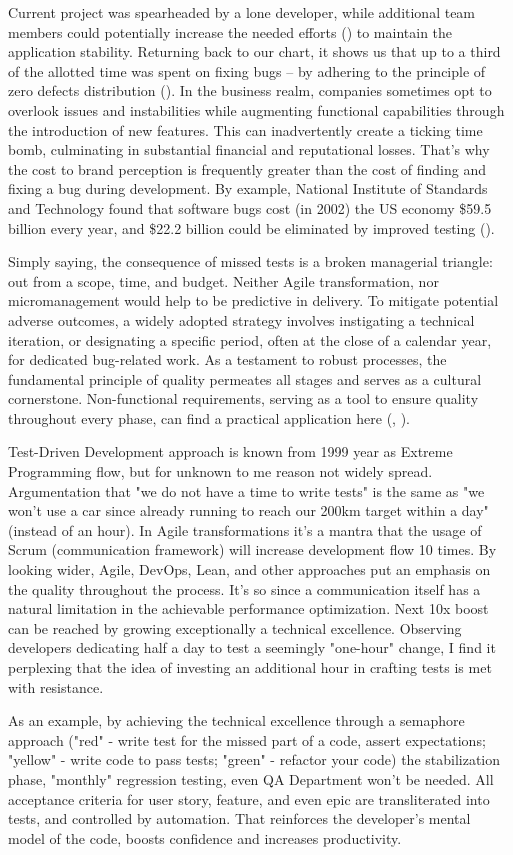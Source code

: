 Current project was spearheaded by a lone developer, while additional team members could potentially increase 
the needed efforts (\cite{Alm21}) to maintain the application stability. Returning back to our chart, it shows us 
that up to a third of the allotted time was spent on fixing bugs -- by adhering to the principle of zero 
defects distribution (\cite{Allan98}). In the business realm, companies sometimes opt to overlook issues and instabilities 
while augmenting functional capabilities through the introduction of new features. This can inadvertently create a ticking 
time bomb, culminating in substantial financial and reputational losses. That's why the cost to brand perception is 
frequently greater than the cost of finding and fixing a bug during development. By example, National Institute of 
Standards and Technology found that software bugs cost (in 2002) the US economy \$59.5 billion every year, and 
\$22.2 billion could be eliminated by improved testing (\cite{RTI02}).

Simply saying, the consequence of missed tests is a broken managerial triangle: out from a scope, time, and budget.
Neither Agile transformation, nor micromanagement would help to be predictive in delivery. To mitigate potential adverse 
outcomes, a widely adopted strategy involves instigating a technical iteration, or designating a specific period, often 
at the close of a calendar year, for dedicated bug-related work. As a testament to robust processes, the fundamental 
principle of quality permeates all stages and serves as a cultural cornerstone. Non-functional requirements, serving 
as a tool to ensure quality throughout every phase, can find a practical application here (\cite{Sam17}, \cite{Suz12}). 

Test-Driven Development approach is known from 1999 year as Extreme Programming flow, but for unknown to me reason 
not widely spread. Argumentation that "we do not have a time to write tests" is the same as "we won't use a car since 
already running to reach our 200km target within a day" (instead of an hour). In Agile transformations it's a mantra 
that the usage of Scrum (communication framework) will increase development flow 10 times. By looking wider, 
Agile, DevOps, Lean, and other approaches put an emphasis on the quality throughout the process. It's so since a 
communication itself has a natural limitation in the achievable performance optimization. Next 10x boost can be reached 
by growing exceptionally a technical excellence. Observing developers dedicating half a day to test a seemingly 
"one-hour" change, I find it perplexing that the idea of investing an additional hour in crafting tests is met with 
resistance.

As an example, by achieving the technical excellence through a semaphore approach ("red" - write test for the missed 
part of a code, assert expectations; "yellow" - write code to pass tests; "green" - refactor your code) the 
stabilization phase, "monthly" regression testing, even QA Department won't be needed. All acceptance criteria for 
user story, feature, and even epic are transliterated into tests, and controlled by automation. That reinforces the 
developer's mental model of the code, boosts confidence and increases productivity.
